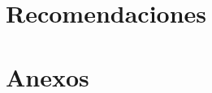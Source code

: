 \documentclass[11pt, letterpaper, twoside, openright]{report}
\newcommand{\defaultparformat}[1]{
	{\setlength{\parskip}{2ex}
     }
}
\begin{document}
\ifdefined\CAPrecomendaciones
	\newpage
	\chapter{Recomendaciones}
	\ifdefined\parpordefecto
		\defaultparformat{l-recomendaciones}
	\else
		
	\fi
\fi

\ifdefined\CAPbibliografia
	\newpage
    \cleardoublepage{}
	\chapter{\bibname}
    \printbibliography[heading=none]
\fi

\ifdefined\CAPanexos
	\newpage
	\chapter{Anexos}
	\ifdefined\parpordefecto
		\defaultparformat{n-anexos}
	\else
		
	\fi
\fi

\ifdefined\CAPglosario
	\newpage
	\printglossary
\fi
\end{document}
